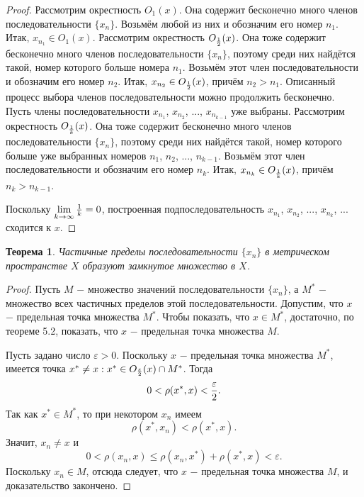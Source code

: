\documentclass{article}
\newtheorem{theorem}{Теорема}[section]
\begin{document}
\begin{proof}
Рассмотрим окрестность \(O_1(x)\). Она содержит бесконечно много членов последовательности \(\{x_n\}\). Возьмём любой из них и обозначим его номер \(n_1\). Итак, \(x_{n_1} \in O_1(x)\). Рассмотрим окрестность \(O_{1 \over 2}(x)\). Она тоже содержит бесконечно много членов последовательности \(\{x_n\}\), поэтому среди них найдётся такой, номер которого больше номера \(n_1\). Возьмём этот член последовательности и обозначим его номер \(n_2\). Итак, \(x_{n_2} \in O_{1 \over 2}(x)\), причём \(n_2 > n_1\). Описанный процесс выбора членов последовательности можно продолжить бесконечно. Пусть члены последовательности \(x_{n_1}\), \(x_{n_2}\), ..., \(x_{n_{k - 1}}\) уже выбраны. Рассмотрим окрестность \(O_{1 \over k}(x)\). Она тоже содержит бесконечно много членов последовательности \(\{x_n\}\), поэтому среди них найдётся такой, номер которого больше уже выбранных номеров \(n_1\), \(n_2\), ..., \(n_{k - 1}\). Возьмём этот член последовательности и обозначим его номер \(n_k\). Итак, \(x_{n_k} \in O_{1 \over k}(x)\), причём \(n_k > n_{k - 1}\).

Поскольку \(\lim\limits_{k \to \infty}{1 \over k} = 0\), построенная подпоследовательность \(x_{n_1}\), \(x_{n_2}\), ..., \(x_{n_{k}}\), ... сходится к \(x\).
\end{proof}

\begin{theorem}
Частичные пределы последовательности \(\{x_n\}\) в метрическом пространстве \(X\) образуют замкнутое множество в \(X\).
\end{theorem}

\begin{proof}
Пусть \(M\) \(-\) множество значений последовательности \(\{x_n\}\), а \(M^{*}\) \(-\) множество всех частичных пределов этой последовательности. Допустим, что \(x\) \(-\) предельная точка множества \(M^{*}\). Чтобы показать, что \(x \in M^{*}\), достаточно, по теореме 5.2, показать, что \(x\) \(-\) предельная точка множества \(M\).

Пусть задано число \(\varepsilon > 0\). Поскольку \(x\) \(-\) предельная точка множества \(M^{*}\), имеется точка \(x^{*} \neq x : x^{*} \in O_{\varepsilon \over 2}(x) \cap M^{*}\). Тогда
\[
0 < \rho(x^{*}, x) < {\varepsilon \over 2}.
\]
Так как \(x^{*} \in M^{*}\), то при некотором \(x_n\) имеем
\[
\rho(x^{*}, x_n) < \rho(x^{*}, x).
\]
Значит, \(x_n \neq x\) и
\[
0 < \rho(x_n, x) \leq \rho(x_n, x^{*}) + \rho(x^{*}, x) < \varepsilon.
\]
Поскольку \(x_n \in M\), отсюда следует, что \(x\) \(-\) предельная точка множества \(M\), и доказательство закончено.
\end{proof}
\end{document}
